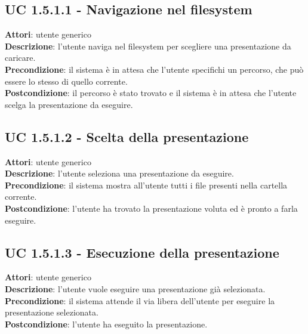 	\subsection{UC 1.5.1.1 - Navigazione nel filesystem}{
		\label{uc1.5.1.1}
		\textbf{Attori}: utente generico \\
		\textbf{Descrizione}: l'utente naviga nel filesystem per scegliere una presentazione da caricare. \\
		\textbf{Precondizione}: il sistema è in attesa che l'utente specifichi un percorso, che può essere lo stesso di quello corrente.	\\
		\textbf{Postcondizione}: il percorso è stato trovato e il sistema è in attesa che l'utente scelga la presentazione da eseguire.	\\
	}
	\subsection{UC 1.5.1.2 - Scelta della presentazione}{
		\label{uc1.5.1.2}
		\textbf{Attori}: utente generico \\
		\textbf{Descrizione}: l'utente seleziona una presentazione da eseguire. \\
		\textbf{Precondizione}: il sistema mostra all'utente tutti i file presenti nella cartella corrente.	\\
		\textbf{Postcondizione}: l'utente ha trovato la presentazione voluta ed è pronto a farla eseguire.	\\
	}
	\subsection{UC 1.5.1.3 - Esecuzione della presentazione}{
		\label{uc1.5.1.3}
		\textbf{Attori}: utente generico \\
		\textbf{Descrizione}: l'utente vuole eseguire una presentazione già selezionata. \\
		\textbf{Precondizione}: il sistema attende il via libera dell'utente per eseguire la presentazione selezionata.	\\
		\textbf{Postcondizione}: l'utente ha eseguito la presentazione.	\\
	}
